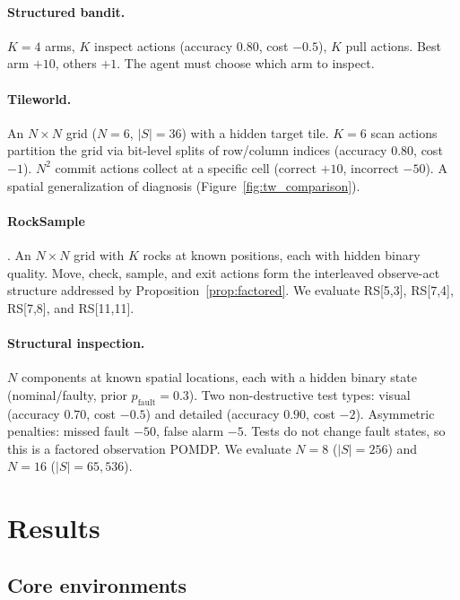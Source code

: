 \documentclass[runningheads]{llncs}
\begin{document}
\paragraph{Structured bandit.} $K{=}4$ arms, $K$ inspect actions (accuracy 0.80, cost $-0.5$), $K$ pull actions. Best arm $+10$, others $+1$. The agent must choose which arm to inspect.

\paragraph{Tileworld.} An $N{\times}N$ grid ($N{=}6$, $|S|{=}36$) with a hidden target tile. $K{=}6$ scan actions partition the grid via bit-level splits of row/column indices (accuracy $0.80$, cost $-1$). $N^2$ commit actions collect at a specific cell (correct $+10$, incorrect $-50$). A spatial generalization of diagnosis (Figure~\ref{fig:tw_comparison}).

\paragraph{RockSample} \citep{smith2004}. An $N{\times}N$ grid with $K$ rocks at known positions, each with hidden binary quality. Move, check, sample, and exit actions form the interleaved observe-act structure addressed by Proposition~\ref{prop:factored}. We evaluate RS[5,3], RS[7,4], RS[7,8], and RS[11,11].

\paragraph{Structural inspection.} $N$ components at known spatial locations, each with a hidden binary state (nominal/faulty, prior $p_{\text{fault}}{=}0.3$). Two non-destructive test types: visual (accuracy $0.70$, cost $-0.5$) and detailed (accuracy $0.90$, cost $-2$). Asymmetric penalties: missed fault $-50$, false alarm $-5$. Tests do not change fault states, so this is a factored observation POMDP. We evaluate $N{=}8$ ($|S|{=}256$) and $N{=}16$ ($|S|{=}65{,}536$).

\section{Results}

\subsection{Core environments}
\end{document}
